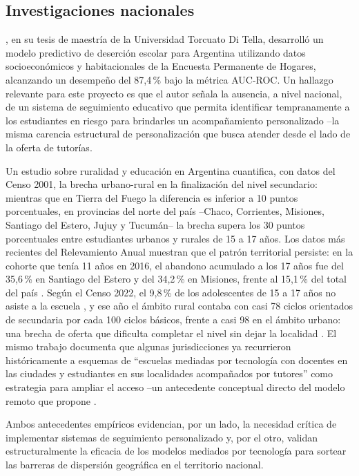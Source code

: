 \subsection{Investigaciones nacionales}

\citet{torino2023}, en su tesis de maestría de la Universidad Torcuato
Di Tella, desarrolló un modelo predictivo de deserción escolar para
Argentina utilizando datos socioeconómicos y habitacionales de la
Encuesta Permanente de Hogares, alcanzando un desempeño del 87,4\,\%
bajo la métrica AUC-ROC. Un hallazgo relevante para este proyecto es que
el autor señala la ausencia, a nivel nacional, de un sistema de
seguimiento educativo que permita identificar tempranamente a los
estudiantes en riesgo para brindarles un acompañamiento personalizado
--la misma carencia estructural de personalización que \sistema{} busca
atender desde el lado de la oferta de tutorías.

Un estudio sobre ruralidad y educación en Argentina \citep{olea}
cuantifica, con datos del Censo 2001, la brecha urbano-rural en la
finalización del nivel secundario: mientras que en Tierra del Fuego la
diferencia es inferior a 10 puntos porcentuales, en provincias del norte
del país --Chaco, Corrientes, Misiones, Santiago del Estero, Jujuy y
Tucumán-- la brecha supera los 30 puntos porcentuales entre estudiantes
urbanos y rurales de 15 a 17 años. Los datos más recientes del
Relevamiento Anual muestran que el patrón territorial persiste: en la
cohorte que tenía 11 años en 2016, el abandono acumulado a los 17 años
fue del 35,6\,\% en Santiago del Estero y del 34,2\,\% en Misiones,
frente al 15,1\,\% del total del país \citep{miguez2023}. Según el Censo
2022, el 9,8\,\% de los adolescentes de 15 a 17 años no asiste a la
escuela \citep{indec2023educacion}, y ese año el ámbito rural contaba con
casi 78 ciclos orientados de secundaria por cada 100 ciclos básicos,
frente a casi 98 en el ámbito urbano: una brecha de oferta que dificulta
completar el nivel sin dejar la localidad \citep{prudant2023}. El mismo trabajo documenta que algunas jurisdicciones ya
recurrieron históricamente a esquemas de ``escuelas mediadas por
tecnología con docentes en las ciudades y estudiantes en sus localidades
acompañados por tutores'' como estrategia para ampliar el acceso --un
antecedente conceptual directo del modelo remoto que propone \sistema{}.

Ambos antecedentes empíricos evidencian, por un lado, la necesidad
crítica de implementar sistemas de seguimiento personalizado y, por el
otro, validan estructuralmente la eficacia de los modelos mediados por
tecnología para sortear las barreras de dispersión geográfica en el
territorio nacional.

